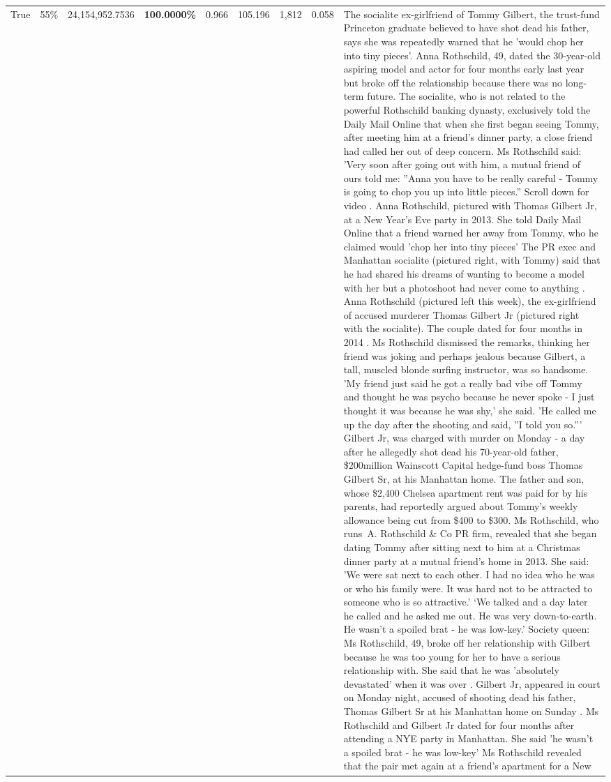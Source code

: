 \begin{table}[H]
\begin{tabular}{lllrlllll}
True & 55\% & 24,154,952.7536 & \bfseries \color{red} 100.0000\% & 0.966 & 105.196 & 1,812 & 0.058 & The socialite ex-girlfriend of Tommy Gilbert, the trust-fund Princeton graduate believed to have shot dead his father, says she was repeatedly warned that he 'would chop her into tiny pieces'. Anna Rothschild, 49, dated the 30-year-old aspiring model and actor for four months early last year but broke off the relationship because there was no long-term future. The socialite, who is not related to the powerful Rothschild banking dynasty, exclusively told the Daily Mail Online that when she first began seeing Tommy, after meeting him at a friend's dinner party, a close friend had called her out of deep concern. Ms Rothschild said: 'Very soon after going out with him, a mutual friend of ours told me: ''Anna you have to be really careful - Tommy is going to chop you up into little pieces.'' Scroll down for video . Anna Rothschild, pictured with Thomas Gilbert Jr, at a New Year's Eve party in 2013. She told Daily Mail Online that a friend warned her away from Tommy, who he claimed would 'chop her into tiny pieces' The PR exec and Manhattan socialite (pictured right, with Tommy) said that he had shared his dreams of wanting to become a model with her but a photoshoot had never come to anything . Anna Rothschild (pictured left this week), the ex-girlfriend of accused murderer Thomas Gilbert Jr (pictured right with the socialite). The couple dated for four months in 2014 . Ms Rothschild dismissed the remarks, thinking her friend was joking and perhaps jealous because Gilbert, a tall, muscled blonde surfing instructor, was so handsome. 'My friend just said he got a really bad vibe off Tommy and thought he was psycho because he never spoke - I just thought it was because he was shy,' she said. 'He called me up the day after the shooting and said, ''I told you so.''' Gilbert Jr, was charged with murder on Monday - a day after he allegedly shot dead his 70-year-old father, \$200million Wainscott Capital hedge-fund boss Thomas Gilbert Sr, at his Manhattan home. The father and son, whose \$2,400 Chelsea apartment rent was paid for by his parents, had reportedly argued about Tommy's weekly allowance being cut from \$400 to \$300. Ms Rothschild, who runs A. Rothschild \& Co PR firm, revealed that she began dating Tommy after sitting next to him at a Christmas dinner party at a mutual friend's home in 2013. She said: 'We were sat next to each other. I had no idea who he was or who his family were. It was hard not to be attracted to someone who is so attractive.' ‘We talked and a day later he called and he asked me out. He was very down-to-earth. He wasn’t a spoiled brat - he was low-key.’ Society queen: Ms Rothschild, 49, broke off her relationship with Gilbert because he was too young for her to have a serious relationship with. She said that he was 'absolutely devastated' when it was over . Gilbert Jr, appeared in court on Monday night, accused of shooting dead his father, Thomas Gilbert Sr at his Manhattan home on Sunday . Ms Rothschild and Gilbert Jr dated for four months after attending a NYE party in Manhattan. She said 'he wasn't a spoiled brat - he was low-key' Ms Rothschild revealed that the pair met again at a friend’s apartment for a New 
\end{tabular}
\end{table}
